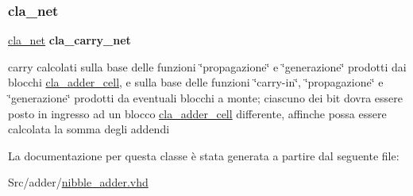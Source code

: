 \subsubsection{\texorpdfstring{cla\+\_\+net}{cla\_net}}
{\footnotesize\ttfamily \hyperlink{classnibble__adder_1_1structural_abbf8fdf15c2d70392ab929c8ebe57439}{cla\+\_\+net} {\bfseries \textcolor{vhdlchar}{cla\+\_\+carry\+\_\+net}\textcolor{vhdlchar}{ }} \hspace{0.3cm}{\ttfamily [Instantiation]}}

carry calcolati sulla base delle funzioni \char`\"{}propagazione\char`\"{} e \char`\"{}generazione\char`\"{} prodotti dai blocchi \hyperlink{classcla__adder__cell}{cla\+\_\+adder\+\_\+cell}, e sulla base delle funzioni \char`\"{}carry-\/in\char`\"{}, \char`\"{}propagazione\char`\"{} e \char`\"{}generazione\char`\"{} prodotti da eventuali blocchi a monte; ciascuno dei bit dovra\textquotesingle{} essere posto in ingresso ad un blocco \hyperlink{classcla__adder__cell}{cla\+\_\+adder\+\_\+cell} differente, affinche\textquotesingle{} possa essere calcolata la somma degli addendi 

La documentazione per questa classe è stata generata a partire dal seguente file\+:\begin{DoxyCompactItemize}
\item 
Src/adder/\hyperlink{nibble__adder_8vhd}{nibble\+\_\+adder.\+vhd}\end{DoxyCompactItemize}
